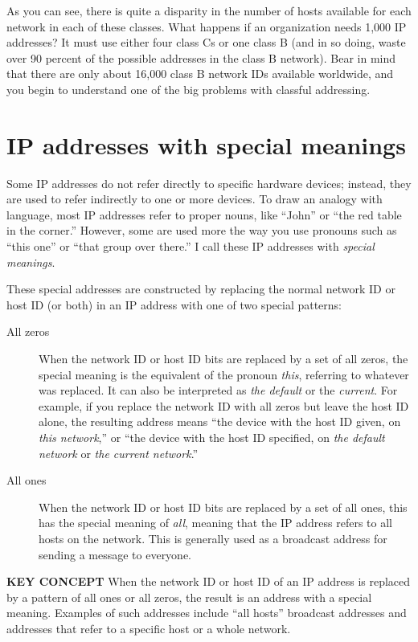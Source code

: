\documentclass[b5paper,11pt]{memoir}
\begin{document}
As you can see, there is quite a disparity in the number of hosts
available for each network in each of these classes. What happens if an
organization needs 1,000
\protect\hypertarget{ch17s03.htmlux5cux23idx-CHP-17-0695}{}{}IP
addresses? It must use either four class Cs or one class B (and in so
doing, waste over 90 percent of the possible addresses in the class B
network). Bear in mind that there are only about 16,000 class B network
IDs available worldwide, and you begin to understand one of the big
problems with classful addressing.


\section{IP addresses with special meanings}

Some IP addresses do not refer directly to specific hardware devices; instead, they are used to refer indirectly to one or more devices.
To draw an analogy with language, most IP addresses refer to proper nouns, like ``John'' or ``the red table in the corner.''
However, some are used more the way you use pronouns such as ``this one'' or ``that group over there.''
I call these IP addresses with \emph{special meanings}.

These special addresses are constructed by replacing the normal network ID or host ID (or both) in an IP address with one of two special patterns:

\begin{description}
   \item[All zeros]
      When the network ID or host ID bits are replaced by a set of all zeros, the special meaning is the equivalent of the pronoun \emph{this}, referring to whatever was replaced.
      It can also be interpreted as \emph{the default} or the \emph{current}.
      For example, if you replace the network ID with all zeros but leave the host ID alone, the resulting address means ``the device with the host ID given, on \emph{this network},'' or ``the device with the host ID specified, on \emph{the default network} or \emph{the current network}.''
   \item[All ones]
      When the network ID or host ID bits are replaced by a set of all ones, this has the special meaning of \emph{all}, meaning that the IP address refers to all hosts on the network.
      This is generally used as a broadcast address for sending a message to everyone.
\end{description}

{\textbf{KEY CONCEPT}} When the network ID or host ID of an IP address
is replaced by a pattern of all ones or all zeros, the result is an
address with a special meaning. Examples of such addresses include ``all hosts'' broadcast addresses and addresses that refer to a specific host or a whole network.
\end{document}
